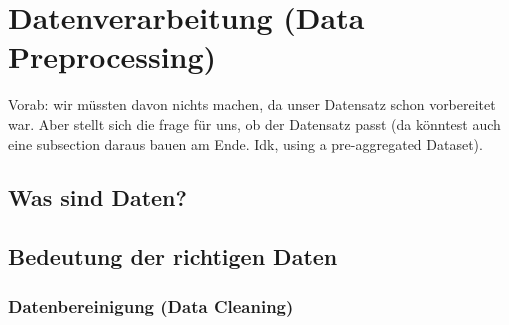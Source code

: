 \chapter{Datenverarbeitung (Data Preprocessing)}

Vorab: wir müssten davon nichts machen, da unser Datensatz schon vorbereitet war. Aber stellt sich die frage für uns, ob der Datensatz passt (da könntest auch eine subsection daraus bauen am Ende. Idk, using a pre-aggregated Dataset).

\section{Was sind Daten?}

\section{Bedeutung der richtigen Daten}

\subsection{Datenbereinigung (Data Cleaning)}

